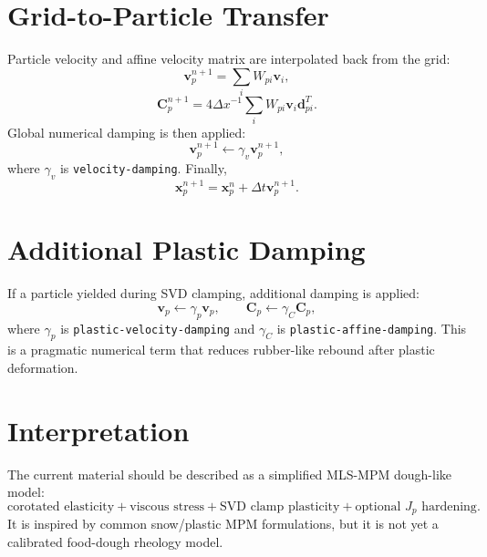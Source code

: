 \documentclass[11pt,a4paper]{article}
\begin{document}
\section{Grid-to-Particle Transfer}

Particle velocity and affine velocity matrix are interpolated back from the
grid:
\[
  \bm{v}_p^{n+1} =
  \sum_i W_{pi}\bm{v}_i,
\]
\[
  \bm{C}_p^{n+1} =
  4\Delta x^{-1}
  \sum_i W_{pi}\bm{v}_i\bm{d}_{pi}^T .
\]
Global numerical damping is then applied:
\[
  \bm{v}_p^{n+1} \leftarrow
  \gamma_v \bm{v}_p^{n+1},
\]
where $\gamma_v$ is \texttt{velocity-damping}. Finally,
\[
  \bm{x}_p^{n+1} =
  \bm{x}_p^n + \Delta t\bm{v}_p^{n+1}.
\]

\section{Additional Plastic Damping}

If a particle yielded during SVD clamping, additional damping is applied:
\[
  \bm{v}_p \leftarrow \gamma_p\bm{v}_p,
  \qquad
  \bm{C}_p \leftarrow \gamma_C\bm{C}_p,
\]
where $\gamma_p$ is \texttt{plastic-velocity-damping} and $\gamma_C$ is
\texttt{plastic-affine-damping}. This is a pragmatic numerical term that reduces
rubber-like rebound after plastic deformation.

\section{Interpretation}

The current material should be described as a simplified MLS-MPM dough-like
model:
\[
  \text{corotated elasticity}
  +
  \text{viscous stress}
  +
  \text{SVD clamp plasticity}
  +
  \text{optional }J_p\text{ hardening}.
\]
It is inspired by common snow/plastic MPM formulations, but it is not yet a
calibrated food-dough rheology model.
\end{document}
